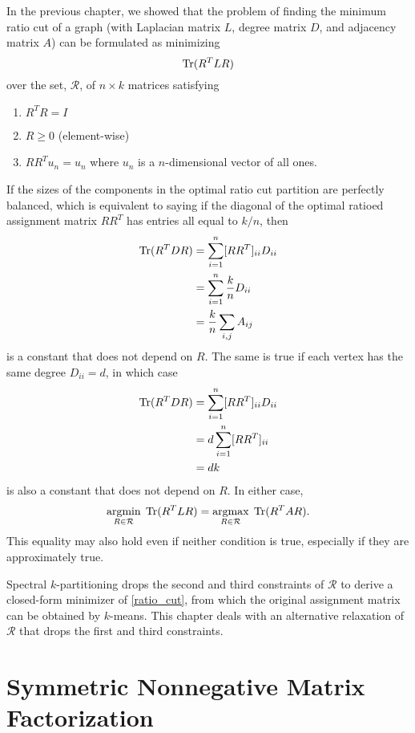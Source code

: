 In the previous chapter, we showed that the problem of finding the
minimum ratio cut of a graph (with Laplacian matrix $L$, degree matrix
$D$, and adjacency matrix $A$) can be formulated as minimizing
\begin{equation} \label{ratio_cut}
\operatorname{Tr}(R^T L R)
\end{equation}
over the set, $\mathcal{R}$, of $n \times k$ matrices satisfying
\begin{enumerate}
\item
$R^T R = I$

\item
$R \geq 0$ (element-wise)

\item
$R R^T u_n = u_n$ where $u_n$ is a $n$-dimensional vector of all ones.
\end{enumerate}

If the sizes of the components in the optimal ratio cut partition
are perfectly balanced, which is equivalent to saying if the diagonal
of the optimal ratioed assignment matrix $R R^T$ has entries all
equal to $k/n$, then
\begin{align*}
\operatorname{Tr}(R^T D R) &= \sum_{i=1}^n [R R^T]_{ii} D_{ii} \\
             &= \sum_{i=1}^n \frac{k}{n} D_{ii} \\
             &= \frac{k}{n} \sum_{i,j} A_{ij}
\end{align*}
is a constant that does not depend on $R$. The same is true if each
vertex has the same degree $D_{ii} = d$, in which case
\begin{align*}
\operatorname{Tr}(R^T D R) &= \sum_{i=1}^n [R R^T]_{ii} D_{ii} \\
             &= d \sum_{i=1}^n [R R^T]_{ii} \\ 
             &= d k
\end{align*}
is also a constant that does not depend on $R$. In either case,
\[ \underset{R \in \mathcal{R}}{\mathrm{arg min}}\; \operatorname{Tr}(R^T L R)
 = \underset{R \in \mathcal{R}}{\mathrm{arg max}}\; \operatorname{Tr}(R^T A R). \]
This equality may also hold even if neither condition is true,
especially if they are approximately true.

Spectral $k$-partitioning drops the second and third constraints
of $\mathcal{R}$ to derive a closed-form minimizer of \ref{ratio_cut},
from which the original assignment matrix can be obtained by $k$-means.
This chapter deals with an alternative relaxation of $\mathcal{R}$ that
drops the first and third constraints.

\section{Symmetric Nonnegative Matrix Factorization}

